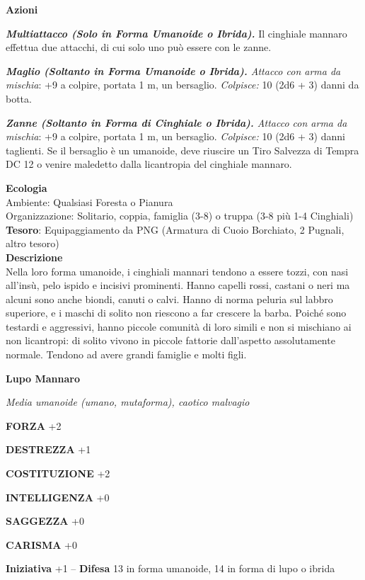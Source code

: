\begin{multicols}{2}
	\textbf{Azioni}

	\textit{\textbf{Multiattacco (Solo in Forma Umanoide o Ibrida).}} Il cinghiale mannaro effettua due attacchi, di cui solo uno può essere con le zanne.

	\textit{\textbf{Maglio (Soltanto in Forma Umanoide o Ibrida).} Attacco con arma da mischia}: +9 a colpire, portata 1 m, un bersaglio. \textit{Colpisce:} 10 (2d6 + 3) danni da botta.

	\textit{\textbf{Zanne (Soltanto in Forma di Cinghiale o Ibrida).} Attacco con arma da mischia}: +9 a colpire, portata 1 m, un bersaglio. \textit{Colpisce:} 10 (2d6 + 3) danni taglienti. Se il bersaglio è un umanoide, deve riuscire un Tiro Salvezza di Tempra DC 12 o venire maledetto dalla licantropia del cinghiale mannaro.

	\textbf{Ecologia}\\
	Ambiente: Qualsiasi Foresta o Pianura\\
	Organizzazione: Solitario, coppia, famiglia (3-8) o truppa (3-8 più 1-4 Cinghiali)\\
	\textbf{Tesoro}: Equipaggiamento da PNG (Armatura di Cuoio Borchiato, 2 Pugnali, altro tesoro)\\
	\textbf{Descrizione}\\
	Nella loro forma umanoide, i cinghiali mannari tendono a essere tozzi, con nasi all'insù, pelo ispido e incisivi prominenti. Hanno capelli rossi, castani o neri ma alcuni sono anche biondi, canuti o calvi. Hanno di norma peluria sul labbro superiore, e i maschi di solito non riescono a far crescere la barba. Poiché sono testardi e aggressivi, hanno piccole comunità di loro simili e non si mischiano ai non licantropi: di solito vivono in piccole fattorie dall'aspetto assolutamente normale. Tendono ad avere grandi famiglie e molti figli.


	\medskip{}\textbf{Lupo Mannaro}

	\textit{Media umanoide (umano, mutaforma), caotico malvagio}

	\textbf{FORZA} +2

	\textbf{DESTREZZA} +1

	\textbf{COSTITUZIONE} +2

	\textbf{INTELLIGENZA} +0

	\textbf{SAGGEZZA} +0

	\textbf{CARISMA} +0

	\textbf{Iniziativa} +1 -- \textbf{Difesa} 13 in forma umanoide, 14 in forma di lupo o ibrida


\end{multicols}
